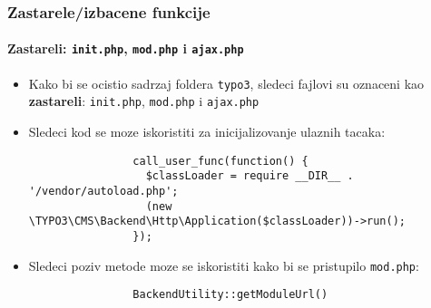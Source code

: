 \begin{frame}[fragile]
	\frametitle{Zastarele/izbacene funkcije}
	\framesubtitle{Zastareli: \texttt{init.php}, \texttt{mod.php} i \texttt{ajax.php}}


	\begin{itemize}

		\item Kako bi se ocistio sadrzaj foldera \texttt{typo3}, sledeci fajlovi su oznaceni kao \textbf{zastareli}: \texttt{init.php}, \texttt{mod.php} i \texttt{ajax.php}

		\item Sledeci kod se moze iskoristiti za inicijalizovanje ulaznih tacaka:

			\begin{lstlisting}
				call_user_func(function() {
				  $classLoader = require __DIR__ . '/vendor/autoload.php';
				  (new \TYPO3\CMS\Backend\Http\Application($classLoader))->run();
				});
			\end{lstlisting}

		\item Sledeci poziv metode moze se iskoristiti kako bi se pristupilo \texttt{mod.php}:

			\begin{lstlisting}
				BackendUtility::getModuleUrl()
			\end{lstlisting}

	\end{itemize}

\end{frame}


